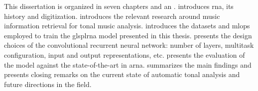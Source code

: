 
This dissertation is organized in seven chapters and an
.
 introduces
\gls{rna}, its history and digitization.
 introduces the relevant research around
music information retrieval for tonal music analysis.
 introduces the
datasets and \gls{mlops} employed to train the glspl{rna}
model presented in this thesis. 
presents the design choices of the convolutional recurrent
neural network: number of layers, multitask configuration,
input and output representations, etc.
 presents the evaluation of
the model against the state-of-the-art in \gls{arna}.
 summarizes the main findings and
presents closing remarks on the current state of automatic
tonal analysis and future directions in the field.
